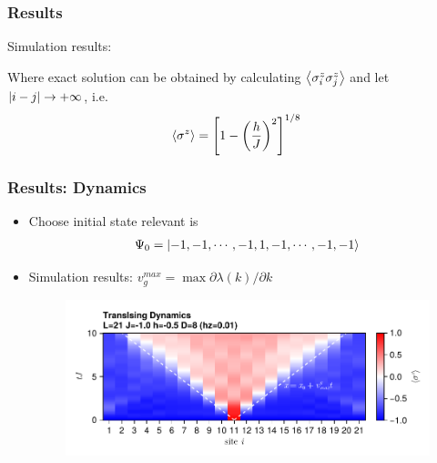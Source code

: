 \documentclass{beamer}
\begin{document}
\begin{frame}
	\frametitle{Results}
	\setcounter{subfigure}{0}
	Simulation results:
	\begin{figure}[H]
		\centering
		\subfigbottomskip=2pt
		\subfigcapskip=-5pt
	\end{figure}
	Where exact solution can be obtained by calculating $\expval{\sigma^z_i \sigma^z_j}$ and let $\abs{i-j}\to +\infty$, i.e.
	\begin{equation}
		\expval{\sigma^z} = \left[1-\left(\frac{h}{J}\right)^2\right]^{1/8}
	\end{equation}
\end{frame}

\begin{frame}
	\frametitle{Results: Dynamics}
	\begin{itemize}
		\item Choose initial state relevant is
		\begin{gather}
			\Psi_0 = \ket{-1,-1,\cdots,-1,1,-1,\cdots,-1,-1}
		\end{gather}
		\item Simulation results: $v_g^{max}=\max{\partial\lambda(k)/\partial k}$
		\begin{figure}[H]
			\includegraphics[width=0.85 \linewidth]{images/Impur_Mi_D=8_L=21_J=-1.0_t=10.pdf}
		\end{figure}
	\end{itemize}
\end{frame}
\end{document}
